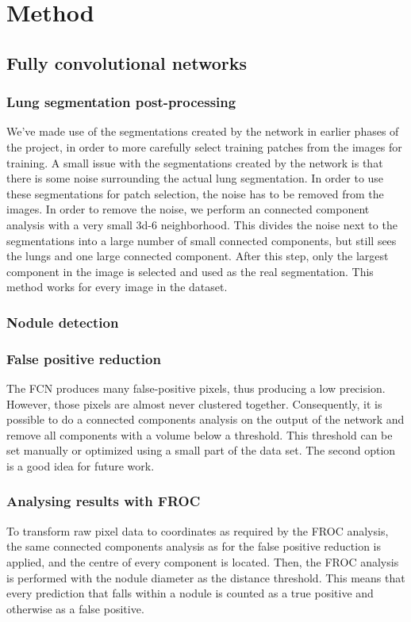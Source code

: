 \documentclass{article}
\begin{document}
\section{Method}\label{sec:method} 
\subsection{Fully convolutional networks}
\subsubsection{Lung segmentation post-processing}
We've made use of the segmentations created by the network in earlier phases of the project, in order to more carefully select training patches from the images for training. A small issue with the segmentations created by the network is that there is some noise surrounding the actual lung segmentation. In order to use these segmentations for patch selection, the noise has to be removed from the images. In order to remove the noise, we perform an connected component analysis with a very small 3d-6 neighborhood. This divides the noise next to the segmentations into a large number of small connected components, but still sees the lungs and one large connected component. After this step, only the largest component in the image is selected and used as the real segmentation. This method works for every image in the dataset.
\cite{long}

\subsubsection{Nodule detection}
\label{sec:fcn}


\subsubsection{False positive reduction}
The FCN produces many false-positive pixels, thus producing a low precision. However, those pixels are almost never clustered together. Consequently, it is possible to do a connected components analysis on the output of the network and remove all components with a volume below a threshold. This threshold can be set manually or optimized using a small part of the data set. The second option is a good idea for future work.

\subsubsection{Analysing results with FROC}
To transform raw pixel data to coordinates as required by the FROC analysis, the same connected components analysis as for the false positive reduction is applied, and the centre of every component is located. Then, the FROC analysis is performed with the nodule diameter as the distance threshold. This means that every prediction that falls within a nodule is counted as a true positive and otherwise as a false positive.
\end{document}
